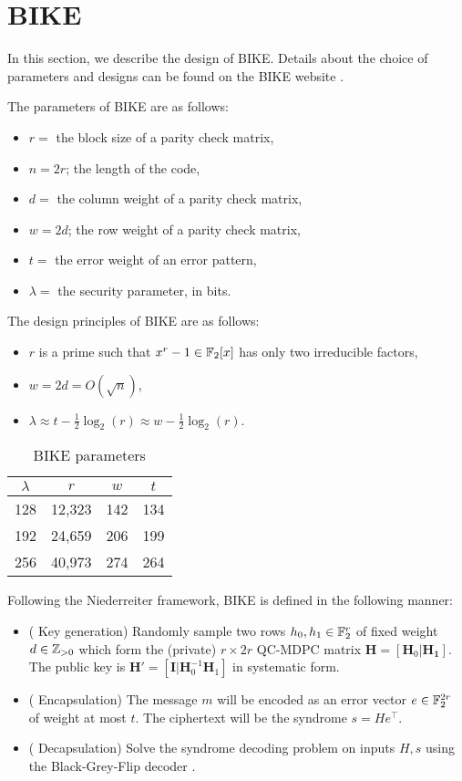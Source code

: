 \section{BIKE}

In this section, we describe the design of BIKE. Details about the choice of parameters and designs can be found on the BIKE website \cite{BIKE}.

The parameters of BIKE are as follows:

\begin{itemize}
\item $r = $ the block size of a parity check matrix,
\item $n = 2r$; the length of the code,
\item $d = $ the column weight of a parity check matrix,
\item $w = 2d$; the row weight of a parity check matrix,
\item $t = $ the error weight of an error pattern,
\item $\lambda = $ the security parameter, in bits.
\end{itemize}

The design principles of BIKE are as follows:

\begin{itemize}
\item $r$ is a prime such that $x^r -1 \in \mathbb{F}_2[x]$ has only two irreducible factors,
\item $w = 2d = O(\sqrt{n})$,
\item $\lambda \approx t - \frac{1}{2}\log_2(r) \approx w - \frac{1}{2}\log_2(r)$.
\end{itemize}

\begin{table}[h]
\centering
\begin{tabular}{cccc}
\hline
$\lambda$ & $r$ & $w$ & $t$ \\ \hline
128 & 12,323 & 142 & 134 \\
192 & 24,659 & 206 & 199 \\
256 & 40,973 & 274 & 264 \\ \hline
\end{tabular}
\caption{BIKE parameters}
\end{table}

Following the Niederreiter framework, BIKE is defined in the following manner:

\begin{itemize}
\item ( Key generation) Randomly sample two rows $h_0, h_1 \in \mathbb{F}_2^r$ of fixed weight $d \in \mathbb{Z}_{> 0}$ which form the (private) $r \times 2r$ QC-MDPC matrix $\mathbf{H} = [ \mathbf{H}_0 | \mathbf{H_1}]$. The public key is $\mathbf{H}' = [\mathbf{I} | \mathbf{H}_0^{-1}\mathbf{H}_1]$ in systematic form.
\item ( Encapsulation) The message $m$ will be encoded as an error vector $e \in \mathbb{F}_2^{2r}$ of weight at  most $t$. The ciphertext will be the syndrome $s = He^\top$.
\item ( Decapsulation) Solve the syndrome decoding problem on inputs $H,s$ using the Black-Grey-Flip decoder \cite{bgf}.
\end{itemize}

